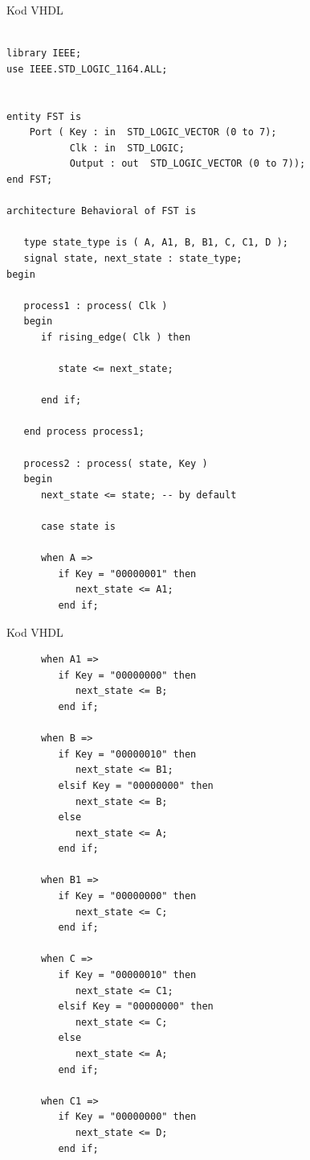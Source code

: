 \documentclass[12pt,a4paper,titlepage]{article}
\begin{document}
\begin{listing}[H]
\caption{Kod VHDL}
\begin{verbatim}

library IEEE;
use IEEE.STD_LOGIC_1164.ALL;


entity FST is
    Port ( Key : in  STD_LOGIC_VECTOR (0 to 7);
           Clk : in  STD_LOGIC;
           Output : out  STD_LOGIC_VECTOR (0 to 7));
end FST;

architecture Behavioral of FST is

   type state_type is ( A, A1, B, B1, C, C1, D );
   signal state, next_state : state_type;
begin
   
   process1 : process( Clk )
   begin
      if rising_edge( Clk ) then
      
         state <= next_state;
      
      end if;
      
   end process process1;

   process2 : process( state, Key )
   begin
      next_state <= state; -- by default
      
      case state is
      
      when A =>
         if Key = "00000001" then
            next_state <= A1;
         end if;
  \end{verbatim}
\end{listing}
\newpage
\begin{listing}[H]
\caption{Kod VHDL}
\begin{verbatim}       
      when A1 =>
         if Key = "00000000" then
            next_state <= B;
         end if; 
      
      when B =>
         if Key = "00000010" then
            next_state <= B1;
         elsif Key = "00000000" then
            next_state <= B;
         else
            next_state <= A;
         end if;

      when B1 =>
         if Key = "00000000" then
            next_state <= C;
         end if; 
         
      when C =>
         if Key = "00000010" then
            next_state <= C1;
         elsif Key = "00000000" then
            next_state <= C;
         else
            next_state <= A;
         end if;
         
      when C1 =>
         if Key = "00000000" then
            next_state <= D;
         end if;
           \end{verbatim}
\end{listing}
\end{document}
